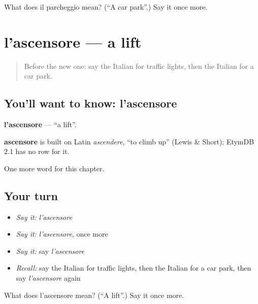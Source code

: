 \begin{tcolorbox}[breakable,colback=teal!4,colframe=teal!35!black,title={Before you move on}]
What does il parcheggio mean? (\textquotedblleft{}A car park\textquotedblright{}.) Say it once more.
\end{tcolorbox}
\section[l'ascensore]{l'ascensore — a lift}

\label{lesson:IT-C90-ascensore}



\begin{quote}
Before the new one: say the Italian for traffic lights, then the Italian for a car park.
\end{quote}

\subsection*{You'll want to know: l'ascensore}
\textbf{l'ascensore} — \textquotedblleft{}a lift\textquotedblright{}.

\begin{cousinweb}
\textbf{ascensore} is built on Latin \emph{ascendere}, \textquotedblleft{}to climb up\textquotedblright{} (Lewis \& Short); EtymDB 2.1 has no row for it.
\end{cousinweb}

\begin{grammarlens}[title={What you've built}]
One more word for this chapter.
\end{grammarlens}

\subsection*{Your turn}
\begin{itemize}
\raggedright
  \item \emph{Say it:} \emph{l'ascensore}
  \item \emph{Say it:} \emph{l'ascensore}, once more
  \item \emph{Say it:} say \emph{l'ascensore}
  \item \emph{Recall:} say the Italian for traffic lights, then the Italian for a car park, then say \emph{l'ascensore} again
\end{itemize}

\begin{tcolorbox}[breakable,colback=teal!4,colframe=teal!35!black,title={Before you move on}]
What does l'ascensore mean? (\textquotedblleft{}A lift\textquotedblright{}.) Say it once more.
\end{tcolorbox}
